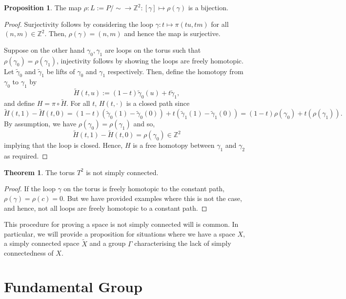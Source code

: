 \documentclass[]{article}
\theoremstyle{definition}
\newtheorem{theorem}{Theorem}
\theoremstyle{definition}
\newtheorem{proposition}{Proposition}[section]
\begin{document}
\begin{proposition}
  The map \(\rho : L := P / \sim \to \mathbb{Z}^2 : [\gamma] \mapsto \rho(\gamma)\)
  is a bijection.
\end{proposition}
\begin{proof}
  Surjectivity follows by considering the loop \(\gamma : t \mapsto \pi(tu, tm)\) for all 
  \((n, m) \in \mathbb{Z}^2\). Then, \(\rho(\gamma) = (n, m)\) and hence the map 
  is surjective.

  Suppose on the other hand \(\gamma_0, \gamma_1\) are loops on the torus such that 
  \(\rho(\gamma_0) = \rho(\gamma_1)\), injectivity follows by showing the loops are 
  freely homotopic. Let \(\tilde \gamma_0\) and \(\tilde \gamma_1\) be lifts of 
  \(\gamma_0\) and \(\gamma_1\) respectively. Then, define the homotopy from 
  \(\gamma_0\) to \(\gamma_1\) by
  \[\tilde H(t, u) := (1 - t)\tilde \gamma_0(u) + t \tilde \gamma_1,\]
  and define \(H = \pi \circ \tilde H\). For all \(t\), \(H(t, \cdot)\) is a 
  closed path since 
  \[\tilde H(t, 1) - \tilde H(t, 0) = (1 - t)(\tilde \gamma_0(1) - \tilde \gamma_0(0))
    + t(\tilde \gamma_1(1) - \tilde \gamma_1(0)) = (1 - t)\rho(\gamma_0) + t(\rho(\gamma_1)).\]
  By assumption, we have \(\rho(\gamma_0) = \rho(\gamma_1)\) and so, 
  \[\tilde H(t, 1) - \tilde H(t, 0) = \rho(\gamma_0) \in \mathbb{Z}^2\]
  implying that the loop is closed. Hence, \(H\) is a free homotopy between 
  \(\gamma_1\) and \(\gamma_2\) as required.
\end{proof}

\begin{theorem}
  The torus \(T^2\) is not simply connected.
\end{theorem}
\begin{proof}
  If the loop \(\gamma\) on the torus is freely homotopic to the constant path, 
  \(\rho(\gamma) = \rho(c) = 0\). But we have provided examples where this is not the case, 
  and hence, not all loops are freely homotopic to a constant path.
\end{proof}

This procedure for proving a space is not simply connected will is common. In particular, 
we will provide a proposition for situations where we have a space \(X\), a simply 
connected space \(\tilde X\) and a group \(\Gamma\) 
characterising the lack of simply connectedness of \(X\).

\newpage
\section{Fundamental Group}
\end{document}
